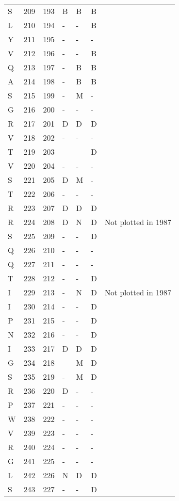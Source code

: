 \begin{longtable}{lllllll}
  S & 209 & 193 & B & B & B &  \\ 
  L & 210 & 194 & - & - & B &  \\ 
  Y & 211 & 195 & - & - & - &  \\ 
  V & 212 & 196 & - & - & B &  \\ 
  Q & 213 & 197 & - & B & B &  \\ 
  A & 214 & 198 & - & B & B &  \\ 
  S & 215 & 199 & - & M & - &  \\ 
  G & 216 & 200 & - & - & - &  \\ 
  R & 217 & 201 & D & D & D &  \\ 
  V & 218 & 202 & - & - & - &  \\ 
  T & 219 & 203 & - & - & D &  \\ 
  V & 220 & 204 & - & - & - &  \\ 
  S & 221 & 205 & D & M & - &  \\ 
  T & 222 & 206 & - & - & - &  \\ 
  R & 223 & 207 & D & D & D &  \\ 
  R & 224 & 208 & D & N & D & Not plotted in 1987 \\ 
  S & 225 & 209 & - & - & D &  \\ 
  Q & 226 & 210 & - & - & - &  \\ 
  Q & 227 & 211 & - & - & - &  \\ 
  T & 228 & 212 & - & - & D &  \\ 
  I & 229 & 213 & - & N & D & Not plotted in 1987 \\ 
  I & 230 & 214 & - & - & D &  \\ 
  P & 231 & 215 & - & - & D &  \\ 
  N & 232 & 216 & - & - & D &  \\ 
  I & 233 & 217 & D & D & D &  \\ 
  G & 234 & 218 & - & M & D &  \\ 
  S & 235 & 219 & - & M & D &  \\ 
  R & 236 & 220 & D & - & - &  \\ 
  P & 237 & 221 & - & - & - &  \\ 
  W & 238 & 222 & - & - & - &  \\ 
  V & 239 & 223 & - & - & - &  \\ 
  R & 240 & 224 & - & - & - &  \\ 
  G & 241 & 225 & - & - & - &  \\ 
  L & 242 & 226 & N & D & D &  \\ 
  S & 243 & 227 & - & - & D &  \\ 

\end{longtable}
